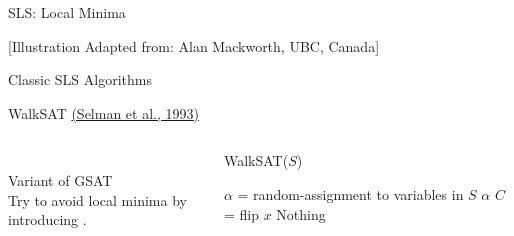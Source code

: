 \documentclass[t]{sdqbeamer}
\begin{document}
\begin{frame}{SLS: Local Minima}
\begin{center}
\end{center}
\begin{footnotesize}
\hfill [Illustration Adapted from: Alan Mackworth, UBC, Canada]
\end{footnotesize}
\end{frame}
	
\begin{frame}{Classic SLS Algorithms}
\begin{block}{WalkSAT \href{https://web2.qatar.cmu.edu/~gdicaro/15281/additional/dimacs93-walksat.pdf}{(Selman et al., 1993)}}
\setlength\columnsep{1ex}
\begin{columns}[T]
	\begin{column}{.3\linewidth}
		~\\ Variant of GSAT\\[1em]
		Try to avoid local minima by introducing .
	\end{column}
	\begin{column}{.6\linewidth}
	\begin{algorithm}[H]
		\DontPrintSemicolon
		\caption{WalkSAT($S$)}
		 {
			$\alpha$ = random-assignment to variables in $S$ \;
			 {
				 {
					\Return $\alpha$
				}
				$C$ =  \;
				 {
					flip $x$
				}
			}
		}
		\Return Nothing 
	\end{algorithm}
	\end{column}
\end{columns}
\end{block}
\end{frame}
	
\end{document}
